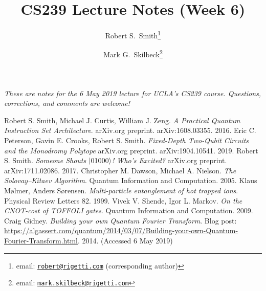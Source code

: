 \documentclass[12pt]{article}
\title{CS239 Lecture Notes (Week 6)}
\author{%
Robert S.\ Smith\footnote{email: \href{mailto:robert@rigetti.com}{\texttt{robert@rigetti.com}} (corresponding author)} \and
Mark G.\ Skilbeck\footnote{email: \href{mailto:mark.skilbeck@rigetti.com}{\texttt{mark.skilbeck@rigetti.com}}}%
}
\date{}
\begin{document}
\maketitle

\begin{center}
\textit{These are notes for the 6 May 2019 lecture for UCLA's CS239 course. Questions, corrections, and comments are welcome!}
\end{center}

\tableofcontents



\newpage



\begin{thebibliography}{1}
   Robert S. Smith, Michael J. Curtis, William J. Zeng. {\em A Practical Quantum Instruction Set Architecture}. arXiv.org preprint. arXiv:1608.03355. 2016.
   Eric C. Peterson, Gavin E. Crooks, Robert S. Smith. {\em Fixed-Depth Two-Qubit Circuits and the Monodromy Polytope} arXiv.org preprint. arXiv:1904.10541. 2019.
   Robert S. Smith. {\em Someone Shouts $\ket{01000}$! Who's Excited?} arXiv.org preprint. arXiv:1711.02086. 2017.
   Christopher M. Dawson, Michael A. Nielson. {\em The Solovay--Kitaev Algorithm}. Quantum Information and Computation. 2005. 
   Klaus M{\o}lmer, Anders S{\o}rensen. {\em Multi-particle entanglement of hot trapped ions}. Physical Review Letters 82. 1999.
   Vivek V. Shende, Igor L. Markov. {\em On the CNOT-cost of TOFFOLI gates}. Quantum Information and Computation. 2009.
   Craig Gidney. {\it Building your own Quantum Fourier Transform}. Blog post: \url{https://algassert.com/quantum/2014/03/07/Building-your-own-Quantum-Fourier-Transform.html}. 2014. (Accessed 6 May 2019)
\end{thebibliography}
\end{document}
